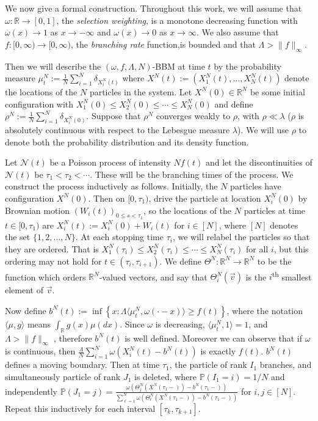 \documentclass{article}
\newcommand{\B}[1]{\mathbb{#1}}
\newcommand{\C}[1]{\mathcal{#1}}
\begin{document}
We now give a formal construction. Throughout this work, we will assume that $\omega:\B{R}\to [0,1]$, the \textit{selection weighting}, is a monotone decreasing function with $\omega(x)\to 1$ as $x\to-\infty$ and $\omega(x)\to 0$ as $x\to\infty$. We also assume that $f:[0,\infty)\to [0,\infty)$, the \textit{branching rate} function,is bounded and that $\Lambda > \|f\|_\infty$. 

Then we will describe the $(\omega,f,\Lambda,N)$-BBM at time $t$ by the probability measure $\mu_t^N:=\frac1N\sum_{i=1}^N \delta_{X_i^N(t)}$ where $X^N(t):=(X_1^N(t),\ldots,X_N^N(t))$ denote the locations of the $N$ particles in the system. Let $X^N(0)\in \B{R}^N$ be some initial configuration with $X_1^N(0)\leq X_2^N(0)\leq \cdots\leq X^N_N(0)$ and define $\rho^N:=\frac1N\sum_{i=1}^N \delta_{X^N_i(0)}$. Suppose that $\rho^N$ converges weakly to $\rho$, with $\rho\ll\lambda$ ($\rho$ is absolutely continuous with respect to the Lebesgue measure $\lambda$). We will use $\rho$ to denote both the probability distribution and its density function.

Let $\C{N}(t)$ be a Poisson process of intensity $Nf(t)$ and let the discontinuities of $\C{N}(t)$ be $\tau_1<\tau_2<\cdots$. These will be the branching times of the process. We construct the process inductively as follows. Initially, the $N$ particles have configuration $X^N(0)$. Then on $[0,\tau_1)$, drive the particle at location $X_i^N(0)$ by Brownian motion $(W_i(t))_{0\leq s<\tau_1}$, so the locations of the $N$ particles at time $t\in [0,\tau_1)$ are $X_i^N(t):=X_i^N(0)+W_i(t)$ for $i\in [N]$, where $[N]$ denotes the set $\{1,2,\ldots,N\}$. At each stopping time $\tau_i$, we will relabel the particles so that they are ordered. That is $X_1^N(\tau_i)\leq X_2^N(\tau_i)\leq \cdots \leq X_N^N(\tau_i)$ for all $i$, but this ordering may not hold for $t\in (\tau_i,\tau_{i+1})$. We define $\Theta^N:\B{R}^N\to\B{R}^N$ to be the function which orders $\B{R}^N$-valued vectors, and say that $\Theta^N_i(\vec{v})$ is the $i$\textsuperscript{th} smallest element of $\vec{v}$.

Now define $b^N(t):=\inf\left\{x:\Lambda \langle \mu_t^N,\omega(\cdot-x)\rangle \geq f(t)\right\}$, where the notation $\langle \mu,g\rangle$ means $\int_\B{R} g(x)\mu(dx)$. Since $\omega$ is decreasing, $\langle \mu_t^N,1\rangle=1$, and $\Lambda > \|f\|_\infty$%
, therefore $b^N(t)$ is well defined. Moreover we can observe that if $\omega$ is continuous, then $\frac{\Lambda}{N} \sum_{i=1}^N \omega(X_i^N(t)-b^N(t))$ is exactly $f(t)$. $b^N(t)$ defines a moving boundary. %
Then at time $\tau_1$, the particle of rank $I_1$ branches, and simultaneously particle of rank $J_1$ is deleted, where $\B{P}(I_1=i)=1/N$ and independently $\B{P}(J_1=j)=\frac{\omega(\Theta^N_j(X^N(\tau_1-))-b^N(\tau_1-))}{\sum_{\ell=1}^N \omega(\Theta^N_\ell(X^N(\tau_1-))-b^N(\tau_1-))}$%
for $i,j\in [N]$. Repeat this inductively for each interval $[\tau_k,\tau_{k+1}]$. 
\end{document}
